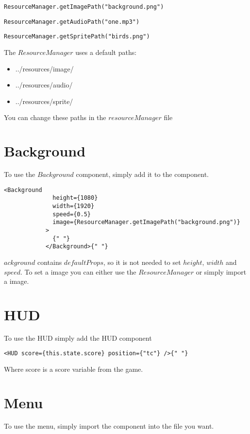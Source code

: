 \begin{lstlisting}
ResourceManager.getImagePath("background.png")
\end{lstlisting}

\begin{lstlisting}
ResourceManager.getAudioPath("one.mp3")
\end{lstlisting}

\begin{lstlisting}
ResourceManager.getSpritePath("birds.png")
\end{lstlisting}

The $ResourceManager$ uses a default paths:

\begin{itemize}
	\item ../resources/image/
    \item ../resources/audio/
    \item ../resources/sprite/
\end{itemize}

You can change these paths in the $resourceManager$ file

\section{Background}

To use the $Background$ component, simply add it to the component.

\begin{lstlisting}
<Background
              height={1080}
              width={1920}
              speed={0.5}
              image={ResourceManager.getImagePath("background.png")}
            >
              {" "}
            </Background>{" "}
\end{lstlisting}

$ackground$ contains $defaultProps$, so it is not needed to set $height$, $width$ and $speed$. To set a image you can either use the $ResourceManager$ or simply import a image.

\section{HUD}
To use the HUD simply add the HUD component
\begin{lstlisting}
<HUD score={this.state.score} position={"tc"} />{" "}
\end{lstlisting}

Where score is a score variable from the game.

\section{Menu}
To use the menu, simply import the component into the file you want.

